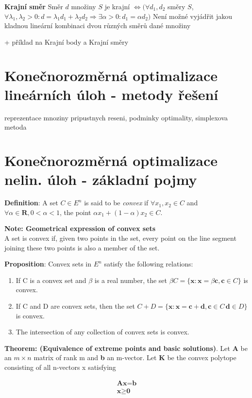 \documentclass[a4]{report}
\theoremstyle{definition}
\begin{document}
\textbf{Krajní směr}
Směr $d$ množiny $S$ je krajní $\Leftrightarrow (\forall d_{1},d_{2} $ směry $S$,$ \forall \lambda _{1},\lambda _{2}> 0:d=\lambda _{1}d_{1}+\lambda_{2}d_{2}\Rightarrow \exists \alpha > 0:d_{1}=\alpha d_{2})$
\newline Není možné vyjádřit jakou kladnou lineární kombinaci dvou různých směrů dané množiny


+ příklad na Krajní body a Krajní směry 

\section{Konečnorozměrná optimalizace lineárních úloh - metody řešení}
reprezentace mnoziny pripustnych reseni, podminky optimality, simplexova metoda

\section{Konečnorozměrná optimalizace nelin. úloh - základní pojmy}
\textbf{Definition}: A set $C \in E^{n}$ is said to be \textit{convex} if $\forall x_{1},x_{2} \in C$ and $\forall \alpha \in \mathbf{R}, 0 < \alpha  < 1$, the point $\alpha x_{1} + (1 - \alpha) x_{2} \in C$.

\textbf{Note: Geometrical expression of convex sets} \\
A set is convex if, given two points in the set, every point on the line segment joining these two
points is also a member of the set.

\textbf{Proposition}: Convex sets in $E^{n}$ satisfy the following relations:
\begin{enumerate}
\item If C is a convex set and $\beta$ is a real number, the set
 $\beta C = \{ \textbf{x}: \textbf{x} = \beta \textbf{c}, \textbf{c} \in C\}$
is convex.
\item If C and D are convex sets, then the set
$ C + D = \{ \textbf{x}: \textbf{x} = \textbf{c} + \textbf{d}, \textbf{c} \in C\, \textbf{d} \in D\}$
is convex.
\item The intersection of any collection of convex sets is convex.
\end{enumerate}

\textbf{Theorem: (Equivalence of extreme points and basic solutions)}. Let \textbf{A} be an
$m\times n$ matrix of rank m and \textbf{b} an m-vector. Let \textbf{K} be the convex polytope
consisting of all n-vectors x satisfying

\begin{align*}
\textbf{Ax} = \textbf{b} \\
\textbf{x} \geq \textbf{0}
\end{align*}
\end{document}
